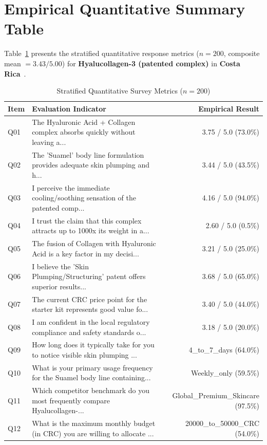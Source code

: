 \documentclass[10pt,twocolumn,a4paper]{article}
\begin{document}
\section{Empirical Quantitative Summary Table}
Table~\ref{tab:metrics} presents the stratified quantitative response metrics ($n = 200$, composite mean $= 3.43/5.00$) for \textbf{Hyalucollagen-3 (patented complex)} in \textbf{Costa Rica}~\cite{ref_kaggle_doi,ref_hf_doi}.

\begin{table}[t]
\centering
\caption{Stratified Quantitative Survey Metrics ($n = 200$)}
\label{tab:metrics}
\small
\begin{tabularx}{\textwidth}{l X r}
\toprule
\textbf{Item} & \textbf{Evaluation Indicator} & \textbf{Empirical Result} \\
\midrule
Q01 & The Hyaluronic Acid + Collagen complex absorbs quickly without leaving a... & 3.75 / 5.0 (73.0\%) \\
Q02 & The 'Suamel' body line formulation provides adequate skin plumping and h... & 3.44 / 5.0 (43.5\%) \\
Q03 & I perceive the immediate cooling/soothing sensation of the patented comp... & 4.16 / 5.0 (94.0\%) \\
Q04 & I trust the claim that this complex attracts up to 1000x its weight in a... & 2.60 / 5.0 (0.5\%) \\
Q05 & The fusion of Collagen with Hyaluronic Acid is a key factor in my decisi... & 3.21 / 5.0 (25.0\%) \\
Q06 & I believe the 'Skin Plumping/Structuring' patent offers superior results... & 3.68 / 5.0 (65.0\%) \\
Q07 & The current CRC price point for the starter kit represents good value fo... & 3.40 / 5.0 (44.0\%) \\
Q08 & I am confident in the local regulatory compliance and safety standards o... & 3.18 / 5.0 (20.0\%) \\
Q09 & How long does it typically take for you to notice visible skin plumping ... & 4\_to\_7\_days (64.0\%) \\
Q10 & What is your primary usage frequency for the Suamel body line containing... & Weekly\_only (59.5\%) \\
Q11 & Which competitor benchmark do you most frequently compare Hyalucollagen-... & Global\_Premium\_Skincare (97.5\%) \\
Q12 & What is the maximum monthly budget (in CRC) you are willing to allocate ... & 20000\_to\_50000\_CRC (54.0\%) \\

\end{tabularx}
\end{table}
\end{document}
